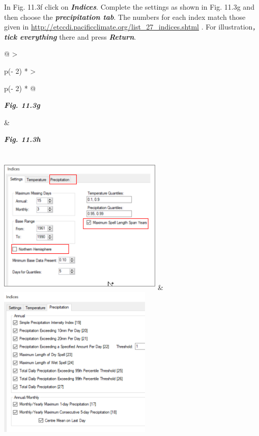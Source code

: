 \documentclass[
  letterpaper,
  DIV=11,
  numbers=noendperiod]{scrreprt}
\begin{document}
In Fig. 11.3f click on \textbf{\emph{Indices}}. Complete the settings as
shown in Fig. 11.3g and then choose the \textbf{\emph{precipitation
tab}}. The numbers for each index match those given in
\href{http://etccdi.pacificclimate.org/list_27_indices.shtml}{\ul{http://etccdi.pacificclimate.org/list\_27\_indices.shtml}}
. For illustration\textbf{\emph{, tick everything}} there and press
\textbf{\emph{Return}}.

\begin{longtable}[]{@{}
  >{\raggedright\arraybackslash}p{(\columnwidth - 2\tabcolsep) * }
  >{\raggedright\arraybackslash}p{(\columnwidth - 2\tabcolsep) * }@{}}
\toprule\noalign{}
\begin{minipage}[b]{\linewidth}\raggedright
\textbf{\emph{Fig. 11.3g}}
\end{minipage} & \begin{minipage}[b]{\linewidth}\raggedright
\textbf{\emph{Fig. 11.3h}}
\end{minipage} \\
\midrule\noalign{}
\endhead
\bottomrule\noalign{}
\endlastfoot
\includegraphics[width=3.09732in,height=2.62261in]{figures/Fig11.3g.png}
&
\includegraphics[width=2.88531in,height=2.86252in]{figures/Fig11.3h.png} \\
\end{longtable}
\end{document}
